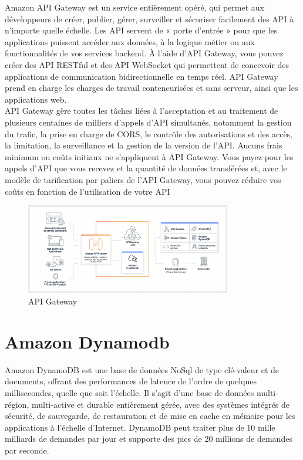 Amazon API Gateway est un service entièrement opéré, qui permet aux développeurs de créer, publier,
gérer, surveiller et sécuriser facilement des API à n’importe quelle échelle. Les API servent de « porte
d’entrée » pour que les applications puissent accéder aux données, à la logique métier ou aux fonctionnalités de vos services backend. À l’aide d’API Gateway, vous pouvez créer des API RESTful et des API
WebSocket qui permettent de concevoir des applications de communication bidirectionnelle en temps réel.
API Gateway prend en charge les charges de travail conteneurisées et sans serveur, ainsi que les applications
web.\\
API Gateway gère toutes les tâches liées à l’acceptation et au traitement de plusieurs centaines de milliers
d’appels d’API simultanés, notamment la gestion du trafic, la prise en charge de CORS, le contrôle des
autorisations et des accès, la limitation, la surveillance et la gestion de la version de l’API. Aucuns frais
minimum ou coûts initiaux ne s’appliquent à API Gateway. Vous payez pour les appels d’API que vous
recevez et la quantité de données transférées et, avec le modèle de tarification par paliers de l’API Gateway,
vous pouvez réduire vos coûts en fonction de l’utilisation de votre API

 \begin{figure}[H]
            \centering
                \includegraphics[width=0.8\textwidth]{Figures/apigateway}
	       \decoRule
		\caption[API Gateway]{API Gateway}
	\label{fig:apigateway}
	\end{figure}


\section{Amazon Dynamodb}
Amazon DynamoDB est une base de données NoSql de type clé-valeur et de documents, offrant des performances de latence de l’ordre de quelques millisecondes, quelle que soit l’échelle. Il s’agit d’une base
de données multi-région, multi-active et durable entièrement gérée, avec des systèmes intégrés de sécurité,
de sauvegarde, de restauration et de mise en cache en mémoire pour les applications à l’échelle d’Internet.
DynamoDB peut traiter plus de 10 mille milliards de demandes par jour et supporte des pics de 20 millions
de demandes par seconde.\\

